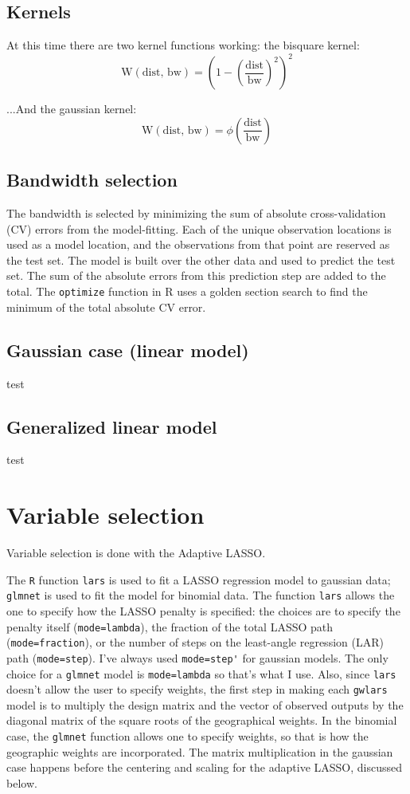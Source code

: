 \documentclass[10pt]{amsart}
\begin{document}
\subsection{Kernels}
At this time there are two kernel functions working: the bisquare kernel:
\[
\text{W}(\text{dist, bw}) = (1-(\frac{\text{dist}}{\text{bw}})^2)^2
\]

...And the gaussian kernel:
\[
\text{W}(\text{dist, bw}) = \phi(\frac{\text{dist}}{\text{bw}})
\]


\subsection{Bandwidth selection}
The bandwidth is selected by minimizing the sum of absolute cross-validation (CV) errors from the model-fitting. Each of the unique observation locations is used as a model location, and the observations from that point are reserved as the test set. The model is built over the other data and used to predict the test set. The sum of the absolute errors from this prediction step are added to the total. The \verb!optimize! function in R uses a golden section search to find the minimum of the total absolute CV error.\\

\subsection{Gaussian case (linear model)}
test

\subsection{Generalized linear model}
test


\section{Variable selection}
Variable selection is done with the Adaptive LASSO.

The \verb!R! function \verb!lars! is used to fit a LASSO regression model to gaussian data; \verb!glmnet! is used to fit the model for binomial data. The function \verb!lars! allows the one to specify how the LASSO penalty is specified: the choices are to specify the penalty itself (\verb!mode=lambda!), the fraction of the total LASSO path (\verb!mode=fraction!), or the number of steps on the least-angle regression (LAR) path (\verb!mode=step!). I've always used \verb!mode=step'! for gaussian models. The only choice for a \verb!glmnet! model is \verb!mode=lambda! so that's what I use. Also, since \verb!lars! doesn't allow the user to specify weights, the first step in making each \verb!gwlars! model is to multiply the design matrix and the vector of observed outputs by the diagonal matrix of the square roots of the geographical weights. In the binomial case, the \verb!glmnet! function allows one to specify weights, so that is how the geographic weights are incorporated. The matrix multiplication in the gaussian case happens before the centering and scaling for the adaptive LASSO, discussed below.\\
\end{document}
